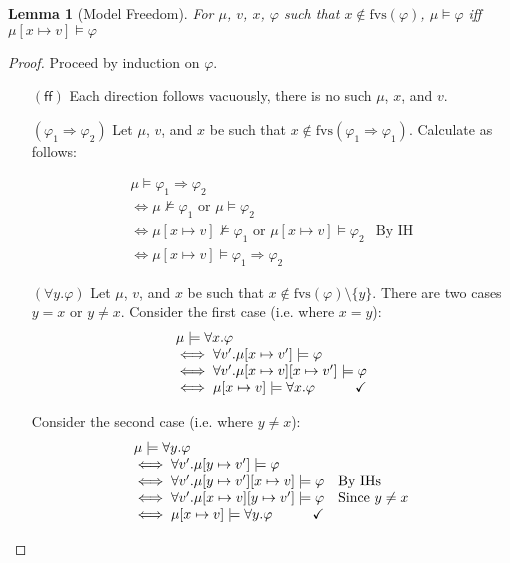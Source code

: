 \documentclass{article}
\newcommand{\FALSE}{\mathsf{ff}}
\newcommand{\fvs}{\textrm{fvs}}
\theoremstyle{plain}
\newtheorem{lemma}{Lemma}
\theoremstyle{definition}
\theoremstyle{remark}
\begin{document}
\begin{lemma}[Model Freedom]
  \label{lem:model-freedom}
  For $\mu$, $v$, $x$, $\varphi$ such that $x \not \in \fvs(\varphi)$,
  $\mu \models \varphi$ iff $\mu[x \mapsto v] \models \varphi$
\end{lemma}
\begin{proof}
  Proceed by induction on $\varphi$.
  \begin{enumerate}[align=left]
    \item[$(\FALSE)$] Each direction follows vacuously, there is no such $\mu$, $x$, and $v$.
    \item[$(\varphi_{1} \Rightarrow \varphi_{2})$] Let $\mu$, $v$, and $x$ be such that $x \not \in \fvs(\varphi_{1} \Rightarrow \varphi_{1})$. Calculate as follows:

    \[\begin{array}{ll}
        \mu \models \varphi_{1} \Rightarrow \varphi_{2}\\
    \iff \mu \not \models \varphi_{1} \text{ or } \mu \models \varphi_{2} \\
    \iff \mu[x \mapsto v] \not\models \varphi_{1} \text{ or } \mu[x \mapsto v] \models \varphi_{2} & \text{By IH}\\
    \iff\mu[x \mapsto v] \models \varphi_{1} \Rightarrow \varphi_{2}
      \end{array}\]

    \item[$(\forall y. \varphi)$] Let $\mu$, $v$, and $x$ be such that $x \not \in \fvs(\varphi) \setminus \{y\}$. There are two cases $y = x$ or $y \neq x$.
    Consider the first case (i.e. where $x = y$):
    \[ \begin{array}{l}
         \mu \models \forall x. \varphi\\
         \iff \forall v'. \mu[x \mapsto v'] \models \varphi \\
         \iff \forall v'. \mu[x \mapsto v][x \mapsto v'] \models \varphi \\
         \iff \mu[x \mapsto v] \models \forall x. \varphi \hfill \checkmark
       \end{array}
     \]

  Consider the second case (i.e. where $y \neq x$):
  \[\begin{array}{ll}
      \mu \models \forall y. \varphi\\
      \iff \forall v'. \mu[y \mapsto v'] \models \varphi \\
      \iff \forall v'. \mu[y \mapsto v'][x \mapsto v] \models \varphi & \text{By IHs}\\
      \iff \forall v'. \mu[x \mapsto v][y \mapsto v'] \models \varphi & \text{Since } y \neq x\\
      \iff \mu[x \mapsto v] \models \forall y. \varphi \hfill \checkmark
    \end{array}\]


\end{enumerate}
\end{proof}
\end{document}

